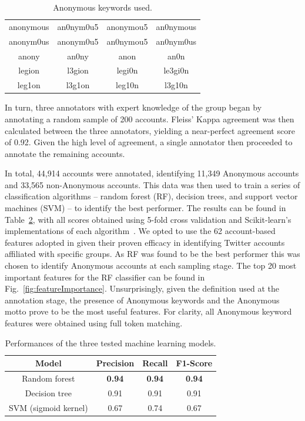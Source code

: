 \documentclass[letterpaper]{article}
\begin{document}
\begin{table}[!tbh]
\footnotesize
\centering
\begin{tabular}{ c c c c }
 \toprule
 anonymous & an0nym0u5 & anonymou5 & an0nymous \\
 anonym0us & anonym0u5 & an0nymou5 & an0nym0us \\
 anony & an0ny & anon & an0n\\
 legion & l3gion & legi0n & le3gi0n\\
     leg1on & l3g1on & leg10n & l3g10n\\
 \bottomrule
\end{tabular}
\caption{Anonymous keywords used.}
\label{table:keywords}
\end{table}

In turn, three annotators with expert knowledge of the group began by annotating a random sample of 200 accounts. Fleiss' Kappa agreement was then calculated between the three annotators, yielding a near-perfect agreement score of 0.92. Given the high level of agreement, a single annotator then proceeded to annotate the remaining accounts.

In total, 44,914 accounts were annotated, identifying 11,349 Anonymous accounts and 33,565 non-Anonymous accounts. This data was then used to train a series of classification algorithms -- random forest (RF), decision trees, and support vector machines (SVM) -- to identify the best performer. The results can be found in Table~\ref{table:ML_performances}, with all scores obtained using 5-fold cross validation and Scikit-learn's implementations of each algorithm~\cite{Pedregosa2011}. We opted to use the 62 account-based features adopted in \cite{Jones2020} given their proven efficacy in identifying Twitter accounts affiliated with specific groups. As RF was found to be the best performer this was chosen to identify Anonymous accounts at each sampling stage. The top 20 most important features for the RF classifier can be found in Fig.~\ref{fig:featureImportance}. Unsurprisingly, given the definition used at the annotation stage, the presence of Anonymous keywords and the Anonymous motto prove to be the most useful features. For clarity, all Anonymous keyword features were obtained using full token matching.

\begin{table}[!tbh]
\footnotesize
\centering
\begin{tabular}{ c c c c }
\toprule
\textbf{Model} & \textbf{Precision} & \textbf{Recall} & \textbf{F1-Score} \\
\midrule
Random forest & \textbf{0.94} & \textbf{0.94} & \textbf{0.94} \\
Decision tree & 0.91 & 0.91 & 0.91\\
SVM (sigmoid kernel) & 0.67 & 0.74 & 0.67\\
\bottomrule
\end{tabular}
\caption{Performances of the three tested machine learning models.}
\label{table:ML_performances}
\end{table}
\end{document}
